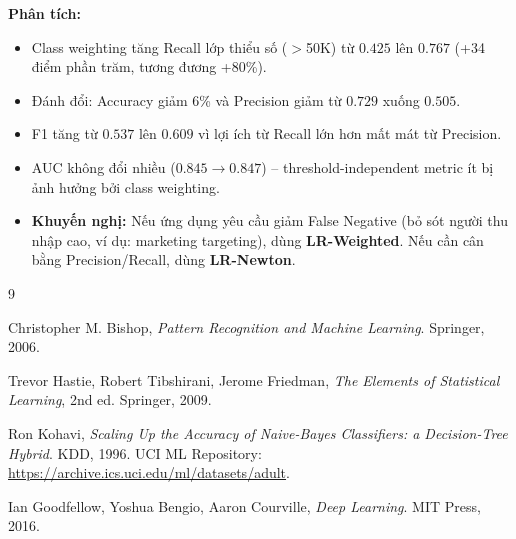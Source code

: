 \documentclass[12pt, a4paper]{article}
\begin{document}
\noindent\textbf{Phân tích:}
\begin{itemize}
  \item Class weighting tăng Recall lớp thiểu số ($>$50K) từ $0.425$ lên
        $\mathbf{0.767}$ (+34 điểm phần trăm, tương đương +80\%).
  \item Đánh đổi: Accuracy giảm 6\% và Precision giảm từ $0.729$ xuống $0.505$.
  \item F1 tăng từ $0.537$ lên $\mathbf{0.609}$ vì lợi ích từ Recall lớn hơn
        mất mát từ Precision.
  \item AUC không đổi nhiều ($0.845 \to 0.847$) -- threshold-independent metric
        ít bị ảnh hưởng bởi class weighting.
  \item \textbf{Khuyến nghị:} Nếu ứng dụng yêu cầu giảm False Negative (bỏ sót
        người thu nhập cao, ví dụ: marketing targeting), dùng \textbf{LR-Weighted}.
        Nếu cần cân bằng Precision/Recall, dùng \textbf{LR-Newton}.
\end{itemize}


\begin{thebibliography}{9}

  Christopher M. Bishop,
  \textit{Pattern Recognition and Machine Learning}.
  Springer, 2006.

  Trevor Hastie, Robert Tibshirani, Jerome Friedman,
  \textit{The Elements of Statistical Learning}, 2nd ed.
  Springer, 2009.

  Ron Kohavi,
  \textit{Scaling Up the Accuracy of Naive-Bayes Classifiers: a Decision-Tree Hybrid}.
  KDD, 1996.
  UCI ML Repository: \url{https://archive.ics.uci.edu/ml/datasets/adult}.

  Ian Goodfellow, Yoshua Bengio, Aaron Courville,
  \textit{Deep Learning}.
  MIT Press, 2016.

\end{thebibliography}
\end{document}
